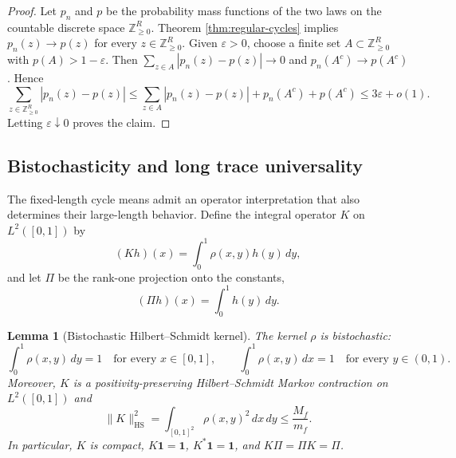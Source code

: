 \documentclass[11pt]{article}
\newtheorem{lemma}[theorem]{Lemma}
\theoremstyle{remark}
\newcommand{\Zz}{\mathbb Z}
\newcommand{\one}{\mathbf 1}
\newcommand{\dd}{\,d}
\begin{document}
\begin{proof}
Let $p_n$ and $p$ be the probability mass functions of the two laws on the
countable discrete space $\Zz_{\ge0}^R$.  Theorem \ref{thm:regular-cycles} implies
$p_n(z)\to p(z)$ for every $z\in\Zz_{\ge0}^R$.  Given $\varepsilon>0$, choose a
finite set $A\subset\Zz_{\ge0}^R$ with $p(A)>1-\varepsilon$.  Then
$\sum_{z\in A}|p_n(z)-p(z)|\to0$ and $p_n(A^c)\to p(A^c)$.  Hence
\[
 \sum_{z\in\Zz_{\ge0}^R}|p_n(z)-p(z)|
 \le \sum_{z\in A}|p_n(z)-p(z)|+p_n(A^c)+p(A^c)
 \le 3\varepsilon+o(1).
\]
Letting $\varepsilon\downarrow0$ proves the claim.
\end{proof}

\subsection{Bistochasticity and long trace universality}\label{subsec:long-traces}

The fixed-length cycle means admit an operator interpretation that also determines
their large-length behavior.  Define the integral operator $K$ on
$L^2([0,1])$ by
\[
        (Kh)(x)=\int_0^1\rho(x,y)h(y)\dd y,
\]
and let $\Pi$ be the rank-one projection onto the constants,
\[
        (\Pi h)(x)=\int_0^1h(y)\dd y.
\]

\begin{lemma}[Bistochastic Hilbert--Schmidt kernel]\label{lem:bistochastic-hs}
The kernel $\rho$ is bistochastic:
\[
        \int_0^1\rho(x,y)\dd y=1
        \quad\text{for every }x\in[0,1],
        \qquad
        \int_0^1\rho(x,y)\dd x=1
        \quad\text{for every }y\in(0,1).
\]
Moreover, $K$ is a positivity-preserving Hilbert--Schmidt Markov contraction on $L^2([0,1])$ and
\[
        \|K\|_{\mathrm{HS}}^2
        =\int_{[0,1]^2}\rho(x,y)^2\dd x\dd y
        \le \frac{M_f}{m_f}.
\]
In particular, $K$ is compact, $K\one=\one$, $K^*\one=\one$, and
$K\Pi=\Pi K=\Pi$.
\end{lemma}
\end{document}
